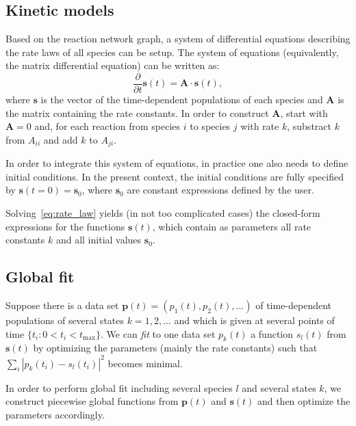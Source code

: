 \documentclass[a4paper,10pt,DIV=15,openany,twoside=false]{scrbook}
\newcommand{\VEC}[1]{\ensuremath{\mathbf{#1}}}
\begin{document}
\subsection{Kinetic models}

Based on the reaction network graph, a system of differential equations describing the rate laws of all species can be setup.
The system of equations (equivalently, the matrix differential equation) can be written as:
\begin{equation}
  \frac{\partial}{\partial t} \VEC{s}(t) = \VEC{A} \cdot \VEC{s}(t),
  \label{eq:rate_law}
\end{equation}
where $\VEC{s}$ is the vector of the time-dependent populations of each species and $\VEC{A}$ is the matrix containing the rate constants.
In order to construct $\VEC{A}$, start with $\VEC{A}=0$ and, for each reaction from species $i$ to species $j$ with rate $k$, substract $k$ from $A_{ii}$ and add $k$ to $A_{ji}$.

In order to integrate this system of equations, in practice one also needs to define initial conditions. 
In the present context, the initial conditions are fully specified by $\VEC{s}(t=0)=\VEC{s}_0$, where $\VEC{s}_0$ are constant expressions defined by the user.

Solving~\eqref{eq:rate_law} yields (in not too complicated cases) the closed-form expressions for the functions $\VEC{s}(t)$, which contain as parameters all rate constants $k$ and all initial values $\VEC{s}_0$.

\subsection{Global fit}

Suppose there is a data set $\VEC{p}(t)=(p_1(t),p_2(t),\dots)$ of time-dependent populations of several states $k=1,2,\dots$ and which is given at several points of time $\{t_i: 0<t_i<t_\mathrm{max}\}$.
We can \textit{fit} to one data set $p_k(t)$ a function $s_l(t)$ from $\VEC{s}(t)$ by optimizing the parameters (mainly the rate constants) such that $\sum_i |p_k(t_i)-s_l(t_i)|^2$ becomes minimal.

In order to perform global fit including several species $l$ and several states $k$, we construct piecewise global functions from $\VEC{p}(t)$ and $\VEC{s}(t)$ and then optimize the parameters accordingly.




\end{document}
